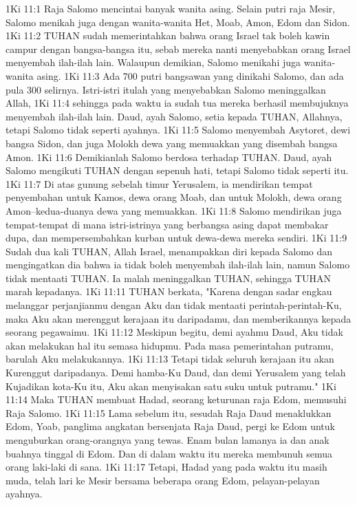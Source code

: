 1Ki 11:1  Raja Salomo mencintai banyak wanita asing. Selain putri raja Mesir, Salomo menikah juga dengan wanita-wanita Het, Moab, Amon, Edom dan Sidon.
1Ki 11:2  TUHAN sudah memerintahkan bahwa orang Israel tak boleh kawin campur dengan bangsa-bangsa itu, sebab mereka nanti menyebabkan orang Israel menyembah ilah-ilah lain. Walaupun demikian, Salomo menikahi juga wanita-wanita asing.
1Ki 11:3  Ada 700 putri bangsawan yang dinikahi Salomo, dan ada pula 300 selirnya. Istri-istri itulah yang menyebabkan Salomo meninggalkan Allah,
1Ki 11:4  sehingga pada waktu ia sudah tua mereka berhasil membujuknya menyembah ilah-ilah lain. Daud, ayah Salomo, setia kepada TUHAN, Allahnya, tetapi Salomo tidak seperti ayahnya.
1Ki 11:5  Salomo menyembah Asytoret, dewi bangsa Sidon, dan juga Molokh dewa yang memuakkan yang disembah bangsa Amon.
1Ki 11:6  Demikianlah Salomo berdosa terhadap TUHAN. Daud, ayah Salomo mengikuti TUHAN dengan sepenuh hati, tetapi Salomo tidak seperti itu.
1Ki 11:7  Di atas gunung sebelah timur Yerusalem, ia mendirikan tempat penyembahan untuk Kamos, dewa orang Moab, dan untuk Molokh, dewa orang Amon--kedua-duanya dewa yang memuakkan.
1Ki 11:8  Salomo mendirikan juga tempat-tempat di mana istri-istrinya yang berbangsa asing dapat membakar dupa, dan mempersembahkan kurban untuk dewa-dewa mereka sendiri.
1Ki 11:9  Sudah dua kali TUHAN, Allah Israel, menampakkan diri kepada Salomo dan mengingatkan dia bahwa ia tidak boleh menyembah ilah-ilah lain, namun Salomo tidak mentaati TUHAN. Ia malah meninggalkan TUHAN, sehingga TUHAN marah kepadanya.
1Ki 11:11  TUHAN berkata, "Karena dengan sadar engkau melanggar perjanjianmu dengan Aku dan tidak mentaati perintah-perintah-Ku, maka Aku akan merenggut kerajaan itu daripadamu, dan memberikannya kepada seorang pegawaimu.
1Ki 11:12  Meskipun begitu, demi ayahmu Daud, Aku tidak akan melakukan hal itu semasa hidupmu. Pada masa pemerintahan putramu, barulah Aku melakukannya.
1Ki 11:13  Tetapi tidak seluruh kerajaan itu akan Kurenggut daripadanya. Demi hamba-Ku Daud, dan demi Yerusalem yang telah Kujadikan kota-Ku itu, Aku akan menyisakan satu suku untuk putramu."
1Ki 11:14  Maka TUHAN membuat Hadad, seorang keturunan raja Edom, memusuhi Raja Salomo.
1Ki 11:15  Lama sebelum itu, sesudah Raja Daud menaklukkan Edom, Yoab, panglima angkatan bersenjata Raja Daud, pergi ke Edom untuk menguburkan orang-orangnya yang tewas. Enam bulan lamanya ia dan anak buahnya tinggal di Edom. Dan di dalam waktu itu mereka membunuh semua orang laki-laki di sana.
1Ki 11:17  Tetapi, Hadad yang pada waktu itu masih muda, telah lari ke Mesir bersama beberapa orang Edom, pelayan-pelayan ayahnya.
